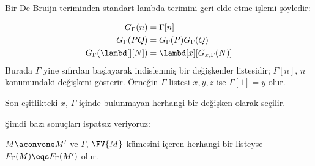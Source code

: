 Bir De Bruijn teriminden standart lambda terimini geri elde etme işlemi
şöyledir:

\begin{defn}
  \begin{align*}
    G_\Gamma(n) &= \Gamma[n] \\
    G_\Gamma(PQ) &= G_\Gamma(P) G_\Gamma(Q) \\
    G_\Gamma(\lambd[][N]) &= \lambd[x][G_{x,\Gamma}(N)]
  \end{align*}
  Burada $\Gamma$ yine sıfırdan başlayarak indislenmiş bir değişkenler
  listesidir; $\Gamma[n]$, $n$ konumundaki değişkeni gösterir. Örneğin
  $\Gamma$ listesi $x,y,z$ ise $\Gamma[1]=y$ olur.

  Son eşitlikteki $x$, $\Gamma$ içinde bulunmayan herhangi bir değişken olarak
  seçilir.
\end{defn}

Şimdi bazı sonuçları ispatsız veriyoruz:

\begin{prop}
  $M \aconvone M'$ ve $\Gamma$, $\FV{M}$ kümesini içeren herhangi bir
  listeyse $F_\Gamma(M) \eqs F_\Gamma(M')$ olur.
\end{prop}


